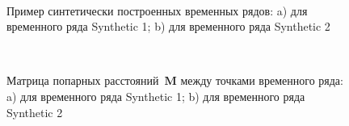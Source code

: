 \begin{figure}[h!t]\center
{}
\\
\caption{Пример синтетически построенных временных рядов: a) для временного ряда Synthetic 1; b) для временного ряда Synthetic 2}
\label{fig_synthetic_series}
\end{figure}

\begin{figure}[h!t]\center
{}
\\
\caption{Матрица попарных расстояний~$\textbf{M}$ между точками временного ряда: a) для временного ряда Synthetic 1; b) для временного ряда Synthetic 2}
\label{fig_synthetic_distance}
\end{figure}

